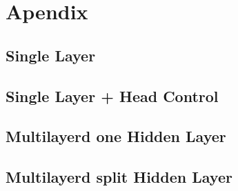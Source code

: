 \chapter{Apendix}
\section{Single Layer}
\section{Single Layer + Head Control}
\section{Multilayerd one Hidden Layer}
\section{Multilayerd split Hidden Layer}
